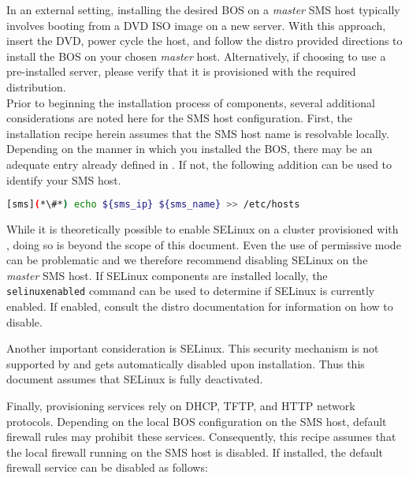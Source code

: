 In an external setting, installing the desired BOS on a
{\em master} SMS host typically involves booting from a DVD ISO image on a new
server. With this approach, insert the \baseOS{} DVD, power cycle the host, and
follow the distro provided directions to install the BOS on your chosen {\em
master} host.  Alternatively, if choosing to use a pre-installed server, please
verify that it is provisioned with the required \baseOS{} distribution. \\

Prior to beginning the installation process of \OHPC{} components, several additional
considerations are noted here for the SMS host configuration. First, 
the installation recipe herein assumes that
the SMS host name is resolvable locally. Depending on the manner in which you
installed the BOS, there may be an adequate entry already defined
in . If not, the following addition can be used to identify
your SMS host.
\begin{lstlisting}[language=bash,keywords={}]
[sms](*\#*) echo ${sms_ip} ${sms_name} >> /etc/hosts
\end{lstlisting}

While it is theoretically possible to enable SELinux on a cluster provisioned
with \provisioner{}, 
doing so is beyond the scope of this document. Even the use of
permissive mode can be problematic and we therefore recommend disabling SELinux on the {\em
master} SMS host. If SELinux components are installed locally,
the \texttt{selinuxenabled} command can be used to determine if SELinux is
currently enabled. If enabled, consult the distro documentation for information
on how to disable. \\
\fi

 Another important consideration is SELinux. This security
mechanism is not supported by \xCAT{} and gets automatically disabled upon
\xCAT{} installation.  Thus this document assumes that SELinux is fully
deactivated. \\ \fi


Finally, provisioning services rely on DHCP, TFTP, and HTTP network protocols.
Depending on the local BOS configuration on the SMS host, default firewall
rules may prohibit these services. Consequently, this recipe assumes that the local
firewall running on the SMS host is disabled. If installed, the default
firewall service can be disabled as follows:
